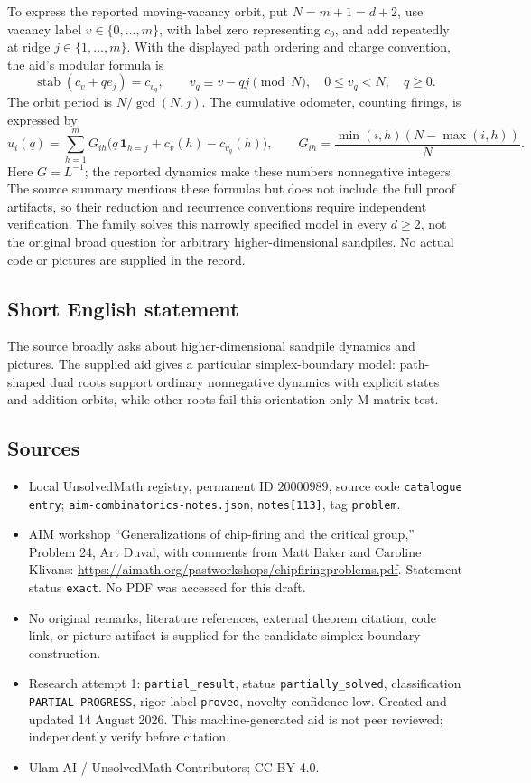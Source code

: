 \documentclass[11pt]{article}
\begin{document}
To express the reported moving-vacancy orbit, put \(N=m+1=d+2\), use vacancy label \(v\in\{0,\ldots,m\}\), with label zero representing \(c_0\), and add repeatedly at ridge \(j\in\{1,\ldots,m\}\). With the displayed path ordering and charge convention, the aid's modular formula is
\[
 \operatorname{stab}(c_v+q e_j)=c_{v_q},\qquad
 v_q\equiv v-qj\pmod N,\quad0\le v_q<N,\quad q\ge0.
\]
The orbit period is \(N/\gcd(N,j)\). The cumulative odometer, counting firings, is expressed by
\[
 u_i(q)=\sum_{h=1}^mG_{ih}\bigl(q\,\mathbf1_{h=j}+c_v(h)-c_{v_q}(h)\bigr),
 \qquad
 G_{ih}=\frac{\min(i,h)(N-\max(i,h))}{N}.
\]
Here \(G=L^{-1}\); the reported dynamics make these numbers nonnegative integers. The source summary mentions these formulas but does not include the full proof artifacts, so their reduction and recurrence conventions require independent verification. The family solves this narrowly specified model in every \(d\ge2\), not the original broad question for arbitrary higher-dimensional sandpiles. No actual code or pictures are supplied in the record.
\subsection{Short English statement}
The source broadly asks about higher-dimensional sandpile dynamics and pictures. The supplied aid gives a particular simplex-boundary model: path-shaped dual roots support ordinary nonnegative dynamics with explicit states and addition orbits, while other roots fail this orientation-only M-matrix test.
\subsection{Sources}
\begin{itemize}
\item Local UnsolvedMath registry, permanent ID \(20000989\), source code \texttt{catalogue entry}; \texttt{aim-combinatorics-notes.json}, \texttt{notes[113]}, tag \texttt{problem}.
\item AIM workshop ``Generalizations of chip-firing and the critical group,'' Problem 24, Art Duval, with comments from Matt Baker and Caroline Klivans: \url{https://aimath.org/pastworkshops/chipfiringproblems.pdf}. Statement status \texttt{exact}. No PDF was accessed for this draft.
\item No original remarks, literature references, external theorem citation, code link, or picture artifact is supplied for the candidate simplex-boundary construction.
\item Research attempt 1: \texttt{partial\_result}, status \texttt{partially\_solved}, classification \texttt{PARTIAL-PROGRESS}, rigor label \texttt{proved}, novelty confidence low. Created and updated 14 August 2026. This machine-generated aid is not peer reviewed; independently verify before citation.
\item Ulam AI / UnsolvedMath Contributors; CC BY 4.0.
\end{itemize}
\end{document}
